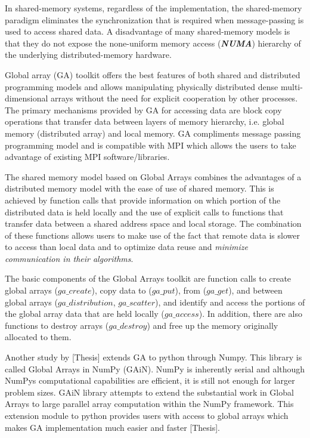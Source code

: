 In shared-memory systems, regardless of the implementation, the shared-memory paradigm eliminates the synchronization that is required when message-passing is used to access shared data. 
A disadvantage of many shared-memory models is that they do not expose the none-uniform memory access (\textbf{\textit{NUMA}}) hierarchy of the underlying distributed-memory hardware. 

Global array (GA) toolkit offers the best features of both shared and distributed programming models and allows manipulating physically distributed dense multi-dimensional arrays without the need for explicit cooperation by other processes.
The primary mechanisms provided by GA for accessing data are block copy operations that transfer data between layers of memory hierarchy, i.e. global memory (distributed array) and local memory. 
GA compliments message passing programming model and is compatible with MPI which allows the users to take advantage of existing MPI software/libraries.

The shared memory model based on Global Arrays combines the advantages of a distributed memory model with the ease of use of shared memory. 
This is achieved by function calls that provide information on which portion of the distributed data is held locally and the use of explicit calls to functions that transfer data between a shared address space and local storage. 
The combination of these functions allows users to make use of the fact that remote data is slower to access than local data and to optimize data reuse and \emph{minimize communication in their algorithms}.

The basic components of the Global Arrays toolkit are function calls to create global arrays ($ga\_create$), copy data to ($ga\_put$), from ($ga\_get$), and between global arrays ($ga\_distribution$, $ga\_scatter$), and identify and access the portions of the global array data that are held locally ($ga\_access$). 
In addition, there are also functions to destroy arrays ($ga\_destroy$) and free up the memory originally allocated to them.

Another study by [Thesis] extends GA to python through Numpy. This library is called Global Arrays in NumPy (GAiN).
NumPy is inherently serial and although NumPy\textquotesingle s computational capabilities are efficient, it is still not enough for larger problem sizes. 
GAiN library attempts to extend the substantial work in Global Arrays to large parallel array computation within the NumPy framework.
This extension module to python provides users with access to global arrays which makes GA implementation much easier and faster [Thesis]. 

